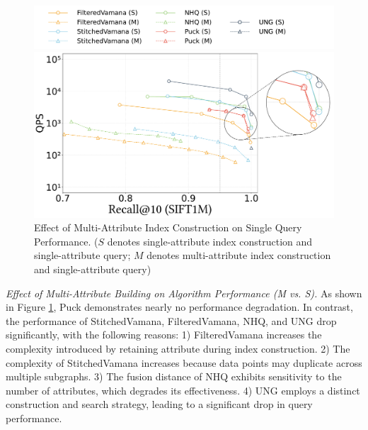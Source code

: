 \documentclass[sigconf, nonacm]{acmart}
\begin{document}
\begin{figure}[th]
    \centering
    \setlength{\abovecaptionskip}{0cm}
    \setlength{\belowcaptionskip}{-0.1cm}
    \hspace*{15pt} %
    \includegraphics[width=0.98\columnwidth]{figures/exp/exp_2_legend.pdf} %
    \vspace{-10pt} %
    
    \includegraphics[width=0.8\columnwidth]{figures/exp/exp_2_1.pdf}
    \caption{Effect of Multi-Attribute Index Construction on Single Query Performance. ($S$ denotes single-attribute index construction and single-attribute query; $M$ denotes multi-attribute index construction and single-attribute query)}
    \label{fig:exp_2_1}
    
\end{figure}

\textit{Effect of Multi-Attribute Building on Algorithm Performance (M vs. S).}
As shown in Figure \ref{fig:exp_2_1}, Puck demonstrates nearly no performance degradation. In contrast, the performance of StitchedVamana, FilteredVamana, NHQ, and UNG drop significantly, with the following reasons: 1) FilteredVamana increases the complexity introduced by retaining attribute during index construction. 2) The complexity of StitchedVamana increases because data points may duplicate across multiple subgraphs. 3) The fusion distance of NHQ exhibits sensitivity to the number of attributes, which degrades its effectiveness. 4) UNG employs a distinct construction and search strategy, leading to a significant drop in query performance.
\end{document}
